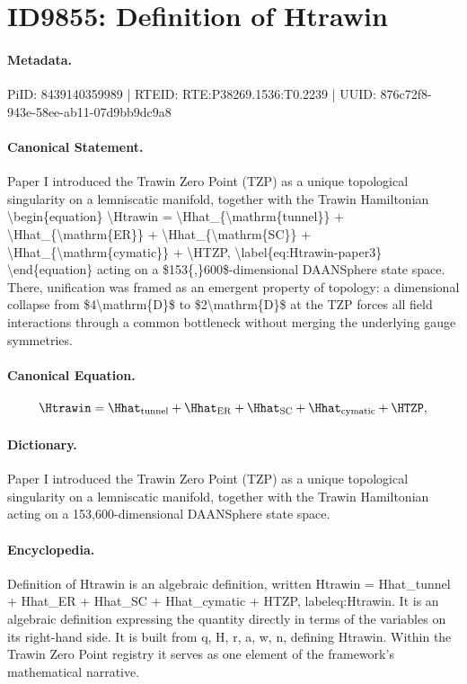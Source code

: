 \section*{ID9855: Definition of Htrawin}
\paragraph{Metadata.}
PiID: 8439140359989 | RTEID: RTE:P38269.1536:T0.2239 | UUID: 876c72f8-943e-58ee-ab11-07d9bb9dc9a8

\paragraph{Canonical Statement.}
Paper I introduced the Trawin Zero Point (TZP) as a unique topological singularity on a lemniscatic manifold, together with the Trawin Hamiltonian \textbackslash{}begin\{equation\} \textbackslash{}Htrawin = \textbackslash{}Hhat\_\{\textbackslash{}mathrm\{tunnel\}\} + \textbackslash{}Hhat\_\{\textbackslash{}mathrm\{ER\}\} + \textbackslash{}Hhat\_\{\textbackslash{}mathrm\{SC\}\} + \textbackslash{}Hhat\_\{\textbackslash{}mathrm\{cymatic\}\} + \textbackslash{}HTZP, \textbackslash{}label\{eq:Htrawin-paper3\} \textbackslash{}end\{equation\} acting on a \$153\{,\}600\$-dimensional DAANSphere state space. There, unification was framed as an emergent property of topology: a dimensional collapse from \$4\textbackslash{}mathrm\{D\}\$ to \$2\textbackslash{}mathrm\{D\}\$ at the TZP forces all field interactions through a common bottleneck without merging the underlying gauge symmetries.

\paragraph{Canonical Equation.}
\[
\Htrawin = \Hhat_{\mathrm{tunnel}} + \Hhat_{\mathrm{ER}} + \Hhat_{\mathrm{SC}} + \Hhat_{\mathrm{cymatic}} + \HTZP, \label{eq:Htrawin-paper3}
\]

\paragraph{Dictionary.}
Paper I introduced the Trawin Zero Point (TZP) as a unique topological singularity on a lemniscatic manifold, together with the Trawin Hamiltonian acting on a 153,600-dimensional DAANSphere state space.

\paragraph{Encyclopedia.}
Definition of Htrawin is an algebraic definition, written Htrawin = Hhat\_tunnel + Hhat\_ER + Hhat\_SC + Hhat\_cymatic + HTZP, labeleq:Htrawin. It is an algebraic definition expressing the quantity directly in terms of the variables on its right-hand side. It is built from q, H, r, a, w, n, defining Htrawin. Within the Trawin Zero Point registry it serves as one element of the framework's mathematical narrative.
